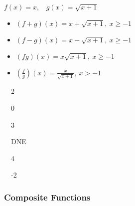 \documentclass[12pt]{book}
\theoremstyle{definition}
\begin{document}
\begin{oddenumerate}
\begin{multicols}{2}
\end{multicols}
\item $f(x)=x,~~~~g(x)=\sqrt{x+1}$ 
\begin{multicols}{2}
\begin{itemize}
\item  $(f+g)(x)=x+\sqrt{x+1},~x\geq-1$
\item  $(f-g)(x)=x-\sqrt{x+1},~x\geq-1$
\end{itemize}
\end{multicols}
\begin{multicols}{2}
\begin{itemize}
\item  $(fg)(x)=x\sqrt{x+1},~x\geq-1$
\item  $\left(\frac{f}{g}\right)(x)=\frac{x}{\sqrt{x+1}},~x>-1$
\end{itemize}
\end{multicols}

\begin{multicols}{2}
\item~~2
\item~~0
\item~~3
\item~~DNE
\item~~4
\item~~-2
\end{multicols}
\end{oddenumerate}

\subsubsection{Composite Functions}
\end{document}
